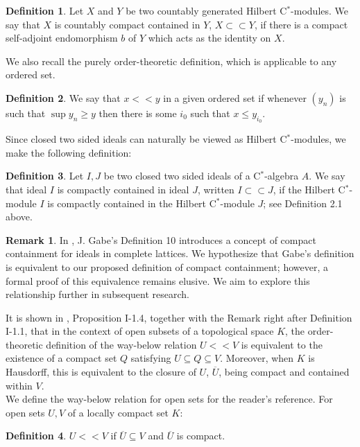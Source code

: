 \documentclass{iopconfser}
\theoremstyle{definition}
\newtheorem{definition}{Definition}[section]
\newtheorem{remark}{Remark}[section]
\begin{document}
\begin{definition}
 Let $X$ and $Y$ be two countably generated Hilbert C$^*$-modules. We say that $X$ is countably compact contained in $Y$,  $ X \subset \subset Y$, if there is a compact self-adjoint endomorphism $b$ of $Y$ which acts as the identity on $X$.  
\end{definition}
We also recall the purely order-theoretic definition, which is applicable to any ordered set.
\begin{definition}
 We say that $x << y$ in a given ordered set if whenever $(y_n)$ is such that $\sup y_n \geq y$ then there is some $i_0$ such that $x \leq y_{i_0}$.   
\end{definition}

Since closed two sided ideals can naturally be viewed as Hilbert C$^*$-modules, we make the following definition:
\begin{definition} Let $I,J$ be two closed two sided ideals of a C$^*$-algebra $A$. We say that ideal $I$ is compactly contained in ideal $J$, written $I \subset \subset J$, if the Hilbert C$^*$-module $I$ is compactly contained in the Hilbert C$^*$-module $J$; see Definition 2.1 above.     
\end{definition}

\begin{remark}
In \cite{Gab}, J. Gabe's Definition 10 introduces a concept of compact containment for ideals in complete lattices. We hypothesize that Gabe's definition is equivalent to our proposed definition of compact containment; however, a formal proof of this equivalence remains elusive. We aim to explore this relationship further in subsequent research. 
\end{remark}

It is shown in \cite{Scott}, Proposition I-1.4, together with the Remark right after Definition I-1.1, that in the context of open subsets of a topological space $K$, the order-theoretic definition of the way-below relation $ U << V$ is equivalent to the existence of a compact set $Q$ satisfying $U \subseteq Q \subseteq V$. Moreover, when $K$ is Hausdorff, this is equivalent to the closure of $U$, $\overline{U}$, being compact and contained within $V$.\\

We define the way-below relation for open sets for the reader's reference.
For open sets $U,V$ of a locally compact set $K$: 
\begin{definition}
 $U << V$ if $\overline{U} \subseteq V$ and  $\overline{U}$ is compact.
\end{definition}
 
\end{document}
